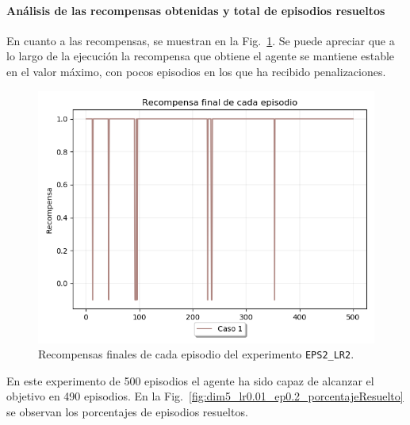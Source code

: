 \paragraph{Análisis de las recompensas obtenidas y total de episodios resueltos} 

En cuanto a las recompensas, se muestran en la Fig.~\ref{fig:dim5_lr0.01_ep0.2_recompensa}. Se puede apreciar que a lo largo de la ejecución la recompensa que obtiene el agente se mantiene estable en el valor máximo, con pocos episodios en los que ha recibido penalizaciones.  \\

\begin{figure}
    \centering
    \includegraphics[scale=0.43]{cap5_experimentacion/images/dim5_lr0.01_ep0.2_recompensa.png}
    \caption{Recompensas finales de cada episodio del experimento \texttt{EPS2\_LR2}.}
    \label{fig:dim5_lr0.01_ep0.2_recompensa}
\end{figure}

En este experimento de 500 episodios el agente ha sido capaz de alcanzar el objetivo en 490 episodios. En la Fig.~\ref{fig:dim5_lr0.01_ep0.2_porcentajeResuelto} se observan los porcentajes de episodios resueltos. \\


